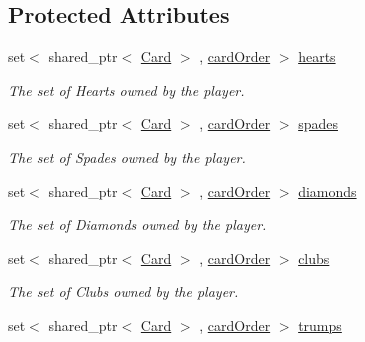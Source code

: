 \subsection*{\-Protected \-Attributes}
\begin{DoxyCompactItemize}
\item 
\hypertarget{classPlayer_afab8e372cfef87440bc42168d5fa0f6a}{set$<$ shared\-\_\-ptr$<$ \hyperlink{classCard}{\-Card} $>$\*
, \hyperlink{structPlayer_1_1cardOrder}{card\-Order} $>$ \hyperlink{classPlayer_afab8e372cfef87440bc42168d5fa0f6a}{hearts}}\label{classPlayer_afab8e372cfef87440bc42168d5fa0f6a}

\begin{DoxyCompactList}\small\item\em \-The set of \-Hearts owned by the player. \end{DoxyCompactList}\item 
\hypertarget{classPlayer_a89177ee8076c1a3411a74b2b1d68156c}{set$<$ shared\-\_\-ptr$<$ \hyperlink{classCard}{\-Card} $>$\*
, \hyperlink{structPlayer_1_1cardOrder}{card\-Order} $>$ \hyperlink{classPlayer_a89177ee8076c1a3411a74b2b1d68156c}{spades}}\label{classPlayer_a89177ee8076c1a3411a74b2b1d68156c}

\begin{DoxyCompactList}\small\item\em \-The set of \-Spades owned by the player. \end{DoxyCompactList}\item 
\hypertarget{classPlayer_a3ad0f1545e0653635eac5ced5c31dc0b}{set$<$ shared\-\_\-ptr$<$ \hyperlink{classCard}{\-Card} $>$\*
, \hyperlink{structPlayer_1_1cardOrder}{card\-Order} $>$ \hyperlink{classPlayer_a3ad0f1545e0653635eac5ced5c31dc0b}{diamonds}}\label{classPlayer_a3ad0f1545e0653635eac5ced5c31dc0b}

\begin{DoxyCompactList}\small\item\em \-The set of \-Diamonds owned by the player. \end{DoxyCompactList}\item 
\hypertarget{classPlayer_ad3f3acdaf6ee318ba528e82e1c188820}{set$<$ shared\-\_\-ptr$<$ \hyperlink{classCard}{\-Card} $>$\*
, \hyperlink{structPlayer_1_1cardOrder}{card\-Order} $>$ \hyperlink{classPlayer_ad3f3acdaf6ee318ba528e82e1c188820}{clubs}}\label{classPlayer_ad3f3acdaf6ee318ba528e82e1c188820}

\begin{DoxyCompactList}\small\item\em \-The set of \-Clubs owned by the player. \end{DoxyCompactList}\item 
\hypertarget{classPlayer_a66b3455fc8c6685a78eb193a015a07a0}{set$<$ shared\-\_\-ptr$<$ \hyperlink{classCard}{\-Card} $>$\*
, \hyperlink{structPlayer_1_1cardOrder}{card\-Order} $>$ \hyperlink{classPlayer_a66b3455fc8c6685a78eb193a015a07a0}{trumps}}\label{classPlayer_a66b3455fc8c6685a78eb193a015a07a0}


\end{DoxyCompactItemize}
